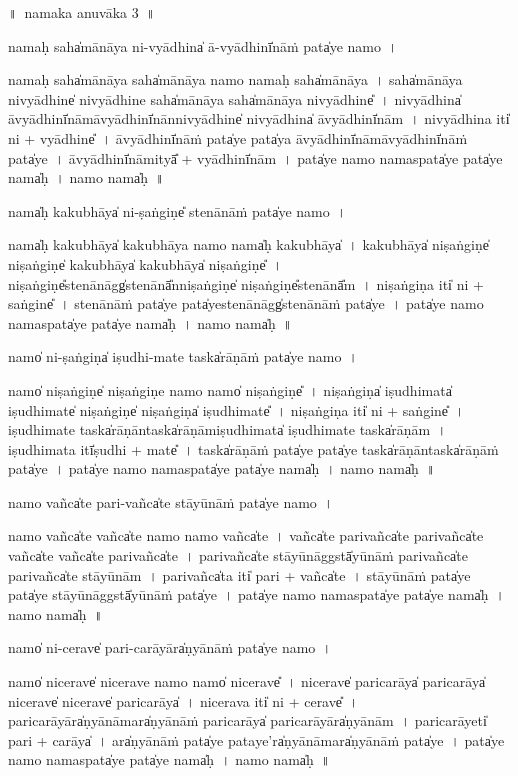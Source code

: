 \documentclass[parskip, DIV=14]{scrartcl}
\begin{document}
{%
\newpage
\LARGE
॥~namaka anuvāka 3~॥ 
\Large

nama॒ḥ saha̍mānāya ni-vyā॒dhina̍ ā-vyā॒dhinī̍nā॒ṁ pata̍ye॒ namo॒~।

nama॒ḥ saha̍mānāya॒ saha̍mānāya॒ namo॒ nama॒ḥ saha̍mānāya~।
saha̍mānāya nivyā॒dhine̍ nivyā॒dhine॒ saha̍mānāya saha̍mānāya nivyā॒dhine̎~।
ni॒vyā॒dhina̍ āvyā॒dhinī̍nāmāvyā॒dhinī̍nānnivyā॒dhine̍ nivyā॒dhina̍ āvyā॒dhinī̍nām~।
ni॒vyā॒dhina॒ iti̍ ni + vyā॒dhine̎~।
ā॒vyā॒dhinī̍nā॒ṁ pata̍ye॒ pata̍ya āvyā॒dhinī̍nāmāvyā॒dhinī̍nā॒ṁ pata̍ye~।
ā॒vyā॒dhinī̍nā॒mityā̎ + vyā॒dhinī̍nām~।
pata̍ye॒ namo॒ nama॒spata̍ye॒ pata̍ye॒ nama̍ḥ~।
namo॒ nama̍ḥ~॥ 

nama̍ḥ kaku॒bhāya̍  ni-ṣa॒ṅgiṇe̎ ste॒nānā॒ṁ pata̍ye॒ namo॒~।

nama̍ḥ kaku॒bhāya̍ kaku॒bhāya॒ namo॒ nama̍ḥ kaku॒bhāya̍~।
ka॒ku॒bhāya̍ niṣa॒ṅgiṇe̍ niṣa॒ṅgiṇe̍ kaku॒bhāya̍ kaku॒bhāya̍ niṣa॒ṅgiṇe̎~।
ni॒ṣa॒ṅgiṇe̎ste॒nānāgg̍ste॒nānā̎nniṣa॒ṅgiṇe̍ niṣa॒ṅgiṇe̎ste॒nānā̎m~।
ni॒ṣa॒ṅgiṇa॒ iti̍ ni + sa॒ṅgine̎~।
ste॒nānā॒ṁ pata̍ye॒ pata̍yeste॒nānāgg̍ste॒nānā॒ṁ pata̍ye~।
pata̍ye॒ namo॒ nama॒spata̍ye॒ pata̍ye॒ nama̍ḥ~।
namo॒ nama̍ḥ~॥ 

namo̍ ni-ṣa॒ṅgiṇa̍ iṣudhi॒-mate॒ taska̍rāṇā॒ṁ pata̍ye॒ namo॒~।

namo̍ niṣa॒ṅgiṇe̍ niṣa॒ṅgiṇe॒ namo॒ namo̍ niṣa॒ṅgiṇe̎~।
ni॒ṣa॒ṅgiṇa̍ iṣudhi॒mata̍ iṣudhi॒mate̍ niṣa॒ṅgiṇe̍ niṣa॒ṅgiṇa̍ iṣudhi॒mate̎~।
ni॒ṣa॒ṅgiṇa॒ iti̍ ni + sa॒ṅgine̎~।
i॒ṣu॒dhi॒mate॒ taska̍rāṇā॒ntaska̍rāṇāmiṣudhi॒mata̍ iṣudhi॒mate॒ taska̍rāṇām~।
i॒ṣu॒dhi॒mata॒ itī̍ṣudhi + mate̎~।
taska̍rāṇā॒ṁ pata̍ye॒ pata̍ye॒ taska̍rāṇā॒ntaska̍rāṇā॒ṁ pata̍ye~।
pata̍ye॒ namo॒ nama॒spata̍ye॒ pata̍ye॒ nama̍ḥ~।
namo॒ nama̍ḥ~॥ 

namo॒ vañca̍te pari॒-vañca̍te stāyū॒nāṁ pata̍ye॒ namo॒~।

namo॒ vañca̍te॒ vañca̍te॒ namo॒ namo॒ vañca̍te~।
vañca̍te pari॒vañca̍te pari॒vañca̍te॒ vañca̍te॒ vañca̍te pari॒vañca̍te~।
pa॒ri॒vañca̍te stāyū॒nāggstā̍yū॒nāṁ pari॒vañca̍te pari॒vañca̍te stāyū॒nām~।
pa॒ri॒vañca̍ta॒ iti̍ pari + vañca̍te~।
stā॒yū॒nāṁ pata̍ye॒ pata̍ye stāyū॒nāggstā̍yū॒nāṁ pata̍ye~।
pata̍ye॒ namo॒ nama॒spata̍ye॒ pata̍ye॒ nama̍ḥ~।
namo॒ nama̍ḥ~॥ 

namo̍ ni-ce॒rave̍ pari-ca॒rāyāra̍ṇyānā॒ṁ pata̍ye॒ namo॒~।

namo̍ nice॒rave̍ nice॒rave॒ namo॒ namo̍ nice॒rave̎~।
ni॒ce॒rave̍ parica॒rāya̍ parica॒rāya̍ nice॒rave̍ nice॒rave̍ parica॒rāya̍~।
ni॒ce॒rava॒ iti̍ ni + ce॒rave̎~।
pa॒ri॒ca॒rāyāra̍ṇyānā॒mara̍ṇyānāṁ parica॒rāya̍ parica॒rāyāra̍ṇyānām~।
pa॒ri॒ca॒rāyeti̍ pari + ca॒rāya̍~।
ara̍ṇyānā॒ṁ pata̍ye॒ pata॒ye'ra̍ṇyānā॒mara̍ṇyānā॒ṁ pata̍ye~।
pata̍ye॒ namo॒ nama॒spata̍ye॒ pata̍ye॒ nama̍ḥ~।
namo॒ nama̍ḥ~॥ 

}
\end{document}
